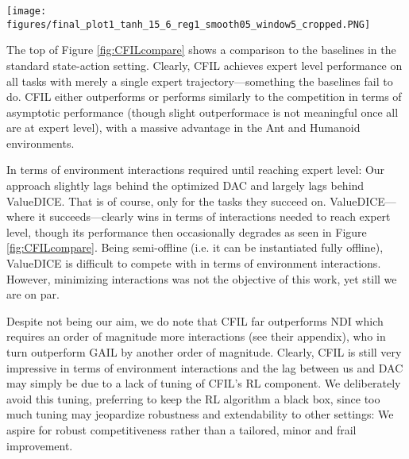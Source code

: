 \begin{figure*}[t!]
\vskip 0.1in
\centering
\texttt{[image: figures/final\_plot1\_tanh\_15\_6\_reg1\_smooth05\_window5\_cropped.PNG]} %
\caption{Top: A comparison of CFIL to ValueDICE and DAC on a single expert trajectory in the standard state-action setting. Bottom: A comparison of two versions of CFIL to OPOLO on a single expert trajectory in the LFO setting, with one version limiting itself only to single states. CFIL uses identical hyperparameters on all environments in all three incarnations, showing outstanding results, particularly in the LFO setting where it far outperforms the highly tailored competitor OPOLO.}
\label{fig:CFILcompare}
\vskip -0.1in
\end{figure*}
The top of Figure \ref{fig:CFILcompare} shows a comparison to the baselines in the standard state-action setting. Clearly, CFIL achieves expert level performance on all tasks with merely a single expert trajectory—something the baselines fail to do. CFIL either outperforms or performs similarly to the competition in terms of asymptotic performance (though slight outperformace is not meaningful once all are at expert level), with a massive advantage in the Ant and Humanoid environments.


In terms of environment interactions required until reaching expert level: Our approach slightly lags behind the optimized DAC and largely lags behind ValueDICE. That is of course, only for the tasks they succeed on. ValueDICE—where it succeeds—clearly wins in terms of interactions needed to reach expert level, though its performance then occasionally degrades as seen in Figure \ref{fig:CFILcompare}. Being semi-offline (i.e. it can be instantiated fully offline), ValueDICE is difficult to compete with in terms of environment interactions. 
However, minimizing interactions was not the objective of this work, yet still we are on par. 

Despite not being our aim, we do note that CFIL far outperforms NDI which requires an order of magnitude more interactions (see their appendix), who in turn outperform GAIL \cite{ho2016generative} by another order of magnitude. Clearly, CFIL is still very impressive in terms of environment interactions and the lag between us and DAC may simply be due to a lack of tuning of CFIL's RL component. We deliberately avoid this tuning, preferring to keep the RL algorithm a black box, since too much tuning may jeopardize robustness and extendability to other settings: We aspire for robust competitiveness rather than a tailored, minor and frail improvement.



